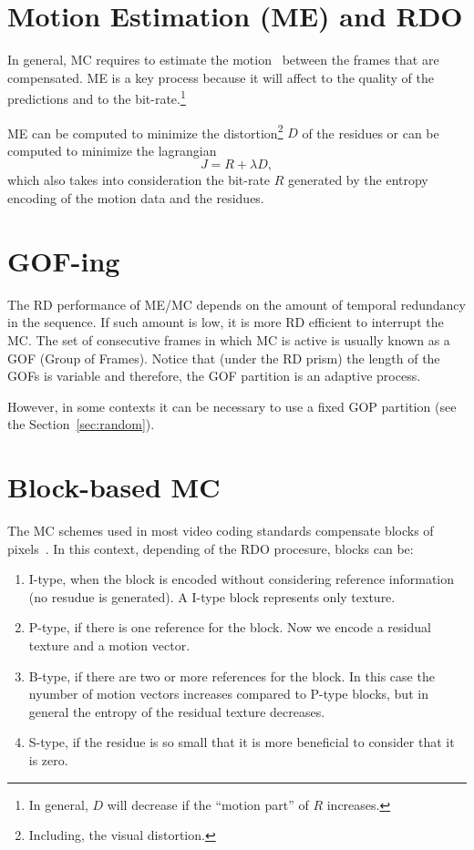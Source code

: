
\section{Motion Estimation (ME) and RDO}

In general, MC requires to estimate the motion~\cite{vruiz__ME}
between the frames that are compensated. ME is a key process because
it will affect to the quality of the predictions and to the
bit-rate.\footnote{In general, $D$ will decrease if the ``motion
  part'' of $R$ increases.}

ME can be computed to minimize the distortion\footnote{Including, the
  visual distortion.} $D$ of the residues or can be computed to
minimize the lagrangian
\begin{equation}
  J = R + \lambda D,
\end{equation}
which also takes into consideration the bit-rate $R$ generated by the
entropy encoding of the motion data and the residues.


\section{GOF-ing}

The RD performance of ME/MC depends on the amount of temporal
redundancy in the sequence. If such amount is low, it is more RD
efficient to interrupt the MC. The set of consecutive frames in which
MC is active is usually known as a GOF (Group of Frames). Notice that
(under the RD prism) the length of the GOFs is variable and therefore,
the GOF partition is an adaptive process.

However, in some contexts it can be necessary to use a fixed GOP
partition (see the Section~\ref{sec:random}).

\section{Block-based MC}

The MC schemes used in most video coding standards compensate blocks
of pixels~\cite{vruiz__BBMC}. In this context, depending of the RDO
procesure, blocks can be:
\begin{enumerate}
\item I-type, when the block is encoded without considering reference
  information (no resudue is generated). A I-type block represents
  only texture.
\item P-type, if there is one reference for the block. Now we encode a
  residual texture and a motion vector.
\item B-type, if there are two or more references for the block. In
  this case the nyumber of motion vectors increases compared to P-type
  blocks, but in general the entropy of the residual texture
  decreases.
\item S-type, if the residue is so small that it is more beneficial to
  consider that it is zero.
\end{enumerate}


